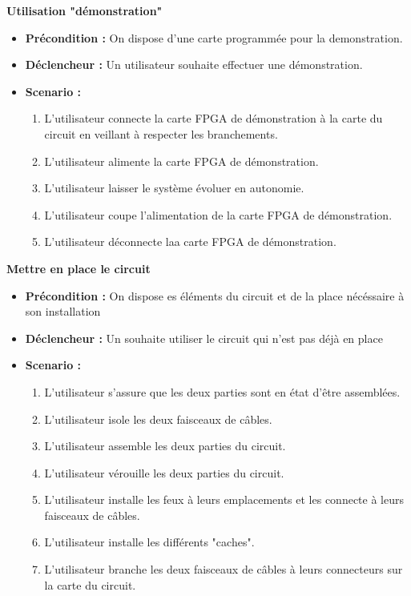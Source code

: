		\textbf{Utilisation "démonstration"}
		\begin{itemize}
			\item \textbf{Précondition :} On dispose d'une carte programmée pour la demonstration.
			\item \textbf{Déclencheur :} Un utilisateur souhaite effectuer une démonstration.
			\item \textbf{Scenario :}
			\begin{enumerate}
				\item L'utilisateur connecte la carte FPGA de démonstration à la carte du circuit en veillant à respecter les branchements.
				\item L'utilisateur alimente la carte FPGA de démonstration.
				\item L'utilisateur laisser le système évoluer en autonomie.
				\item L'utilisateur coupe l'alimentation de la carte FPGA de démonstration.
				\item L'utilisateur déconnecte laa carte FPGA de démonstration.
			\end{enumerate}
		\end{itemize}

		\textbf{Mettre en place le circuit}
		\begin{itemize}
			\item \textbf{Précondition :} On dispose es éléments du circuit et de la place nécéssaire à son installation
			\item \textbf{Déclencheur :} Un souhaite utiliser le circuit qui n'est pas déjà en place
			\item \textbf{Scenario :}
			\begin{enumerate}
				\item L'utilisateur s'assure que les deux parties sont en état d'être assemblées.
				\item L'utilisateur isole les deux faisceaux de câbles.
				\item L'utilisateur assemble les deux parties du circuit.
				\item L'utilisateur vérouille les deux parties du circuit.
				\item L'utilisateur installe les feux à leurs emplacements et les connecte à leurs faisceaux de câbles.
				\item L'utilisateur installe les différents "caches".
				\item L'utilisateur branche les deux faisceaux de câbles à leurs connecteurs sur la carte du circuit.
			\end{enumerate}
		\end{itemize}

